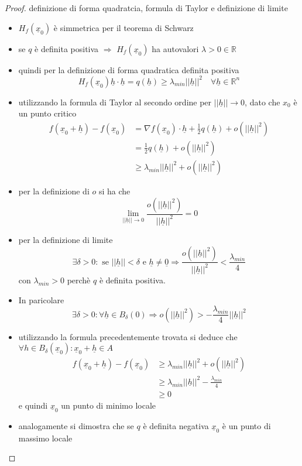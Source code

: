 \documentclass[12pt, a4paper]{article}
\theoremstyle{break}
\begin{document}
\begin{proof} definizione di forma quadratcia, formula di Taylor e definizione
	di limite
	\begin{itemize}
		\item $H_f(\underline{x}_0)$ è simmetrica per il teorema di Schwarz
		\item se $q$ è definita positiva $\Rightarrow$ $H_f(\underline{x}_0)$ ha
			autovalori $\lambda > 0 \in \mathbb{R}$
		\item quindi per la definizione di forma quadratica definita positiva
			\[
				H_f(\underline{x}_0) \underline{h} \cdot \underline{h} = q
				(\underline{h}) \geq \lambda_{min} ||\underline{h}||^2
				\quad \forall \underline{h} \in \mathbb{R}^n
			\]
		\item utilizzando la formula di Taylor al secondo ordine per
			$||\underline{h}|| \to 0$, dato che $x_0$ è un punto critico
			\begin{align*}
				f(\underline{x}_0 + \underline{h}) - f(\underline{x}_0) & =
				\nabla f(\underline{x}_0) \cdot \underline{h} + \frac{1}{2}
				q(\underline{h}) + o(||\underline{h}||^2)
				\\ & = \frac{1}{2} q(\underline{h})+ o(||\underline{h}||^2)
				\\ & \geq \lambda_{min} ||\underline{h}||^2 +
				o(||\underline{h}||^2)
			\end{align*}
		\item per la definizione di $o$ si ha che
			\[
				\lim_{||\underline{h}|| \to 0} \frac{o(||\underline{h}||^2)}
				{||\underline{h}||^2} = 0
			\]
		\item per la definizione di limite
			\[
				\exists \delta > 0 : \text{ se } ||\underline{h}|| < \delta
				\text{ e } \underline{h} \neq \underline{0} \Rightarrow
				\frac{o(||\underline{h}||^2)} {||\underline{h}||^2} <
				\frac{\lambda_{min}}{4}
			\]
			con $\lambda_{min} > 0$ perchè $q$ è definita positiva.\\
		\item In paricolare
			\[
				\exists \delta > 0 : \forall \underline{h} \in B_{\delta}(0)
				\Rightarrow o(||\underline{h}||^2) > -\frac{\lambda_{min}}{4}
				||\underline{h}||^2
			\]
		\item utilizzando la formula precedentemente trovata si deduce che
			$\forall h \in B_{\delta}(\underline{x}_0): \underline{x}_0 +
				\underline{h} \in A$
			\begin{align*}
				f(\underline{x}_0 + \underline{h}) - f(\underline{x}_0) & \geq
				\lambda_{min} ||\underline{h}||^2 + o(||\underline{h}||^2)
				\\ & \geq \lambda_{min} ||\underline{h}||^2 -
				\frac{\lambda_{min}}{4}
				\\ & \geq 0
			\end{align*}
			e quindi $\underline{x}_0 $ un punto di minimo locale
		\item analogamente si dimostra che se $q$ è definita negativa
			$\underline{x}_0$ è un punto di massimo locale
	\end{itemize}
\end{proof}
\end{document}
